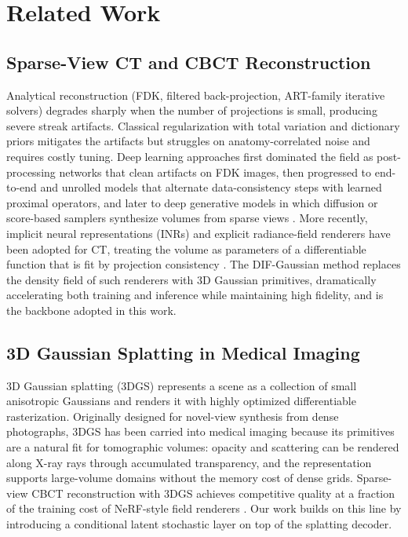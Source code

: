 
\section{Related Work}
\label{sec:rel}

\subsection{Sparse-View CT and CBCT Reconstruction}
\label{sec:rel:cbct}

Analytical reconstruction (FDK, filtered back-projection, ART-family
iterative solvers) degrades sharply when the number of projections is
small, producing severe streak artifacts. Classical regularization with
total variation and dictionary priors mitigates the artifacts but
struggles on anatomy-correlated noise and requires costly tuning.
Deep learning approaches first dominated the field as post-processing
networks that clean artifacts on FDK images, then progressed to
end-to-end and unrolled models that alternate data-consistency steps
with learned proximal operators, and later to deep generative models in
which diffusion or score-based samplers synthesize volumes from sparse
views \cite{song2021scorebased}. More recently, implicit neural
representations (INRs) and explicit radiance-field renderers have been
adopted for CT, treating the volume as parameters of a differentiable
function that is fit by projection consistency \cite{mildenhall2020nerf}.
The DIF-Gaussian method \cite{lin2024difgaussian} replaces the density
field of such renderers with 3D Gaussian primitives, dramatically
accelerating both training and inference while maintaining high
fidelity, and is the backbone adopted in this work.

\subsection{3D Gaussian Splatting in Medical Imaging}
\label{sec:rel:3dgs}

3D Gaussian splatting (3DGS) \cite{kerbl2023gaussiansplats} represents a
scene as a collection of small anisotropic Gaussians and renders it with
highly optimized differentiable rasterization. Originally designed for
novel-view synthesis from dense photographs, 3DGS has been carried into
medical imaging because its primitives are a natural fit for tomographic
volumes: opacity and scattering can be rendered along X-ray rays through
accumulated transparency, and the representation supports large-volume
domains without the memory cost of dense grids. Sparse-view CBCT
reconstruction with 3DGS achieves competitive quality at a fraction of
the training cost of NeRF-style field renderers \cite{lin2024difgaussian}.
Our work builds on this line by introducing a conditional latent
stochastic layer on top of the splatting decoder.

